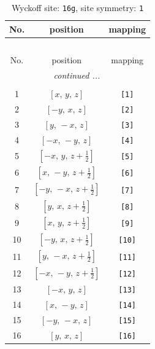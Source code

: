 \documentclass[fleqn,8pt]{jsarticle}
\begin{document}
\begin{longtable}{ccc}
\caption{Wyckoff site: {\tt 16g}, site symmetry: {\tt 1}}
 \\
 \hline \hline
No. & position & mapping \\ \hline \endfirsthead

\multicolumn{2}{l}{\tablename\ \thetable{}} \\
 \hline \hline
No. & position & mapping \\ \hline \endhead

 \hline \hline
\multicolumn{2}{r}{\footnotesize\it continued ...} \\ \endfoot

 \hline \hline
\multicolumn{2}{r}{} \\ \endlastfoot

1 & $\left[ x,\, y,\, z \right]$ & {\tt [1]} \\ \hline
2 & $\left[ - y,\, x,\, z \right]$ & {\tt [2]} \\ \hline
3 & $\left[ y,\, - x,\, z \right]$ & {\tt [3]} \\ \hline
4 & $\left[ - x,\, - y,\, z \right]$ & {\tt [4]} \\ \hline
5 & $\left[ - x,\, y,\, z + \frac{1}{2} \right]$ & {\tt [5]} \\ \hline
6 & $\left[ x,\, - y,\, z + \frac{1}{2} \right]$ & {\tt [6]} \\ \hline
7 & $\left[ - y,\, - x,\, z + \frac{1}{2} \right]$ & {\tt [7]} \\ \hline
8 & $\left[ y,\, x,\, z + \frac{1}{2} \right]$ & {\tt [8]} \\ \hline
9 & $\left[ x,\, y,\, z + \frac{1}{2} \right]$ & {\tt [9]} \\ \hline
10 & $\left[ - y,\, x,\, z + \frac{1}{2} \right]$ & {\tt [10]} \\ \hline
11 & $\left[ y,\, - x,\, z + \frac{1}{2} \right]$ & {\tt [11]} \\ \hline
12 & $\left[ - x,\, - y,\, z + \frac{1}{2} \right]$ & {\tt [12]} \\ \hline
13 & $\left[ - x,\, y,\, z \right]$ & {\tt [13]} \\ \hline
14 & $\left[ x,\, - y,\, z \right]$ & {\tt [14]} \\ \hline
15 & $\left[ - y,\, - x,\, z \right]$ & {\tt [15]} \\ \hline
16 & $\left[ y,\, x,\, z \right]$ & {\tt [16]} \\
\end{longtable}
\end{document}
